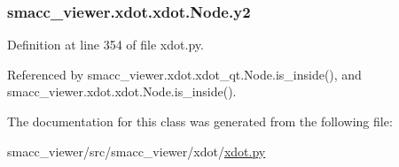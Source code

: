 \subsubsection[{\texorpdfstring{y2}{y2}}]{\setlength{\rightskip}{0pt plus 5cm}smacc\+\_\+viewer.\+xdot.\+xdot.\+Node.\+y2}\hypertarget{classsmacc__viewer_1_1xdot_1_1xdot_1_1Node_acbf410115b432ecb490f469f7d477a2a}{}\label{classsmacc__viewer_1_1xdot_1_1xdot_1_1Node_acbf410115b432ecb490f469f7d477a2a}


Definition at line 354 of file xdot.\+py.



Referenced by smacc\+\_\+viewer.\+xdot.\+xdot\+\_\+qt.\+Node.\+is\+\_\+inside(), and smacc\+\_\+viewer.\+xdot.\+xdot.\+Node.\+is\+\_\+inside().



The documentation for this class was generated from the following file\+:\begin{DoxyCompactItemize}
\item 
smacc\+\_\+viewer/src/smacc\+\_\+viewer/xdot/\hyperlink{xdot_8py}{xdot.\+py}\end{DoxyCompactItemize}
